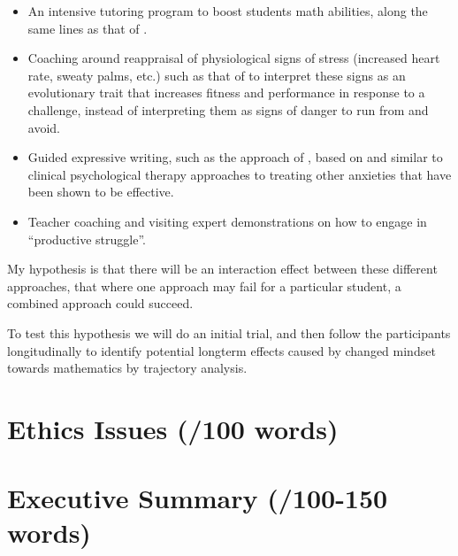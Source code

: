 \documentclass[14pt]{memoir}
\begin{document}
\begin{itemize}
	\item An intensive tutoring program to boost students math abilities, along the same lines as that of .
	\item Coaching around reappraisal of physiological signs of stress (increased heart rate, sweaty palms, etc.) such as that of  to interpret these signs as an evolutionary trait that increases fitness and performance in response to a challenge, instead of interpreting them as signs of danger to run from and avoid.
	\item Guided expressive writing, such as the approach of , based on and similar to clinical psychological therapy approaches to treating other anxieties that have been shown to be effective.
	\item Teacher coaching and visiting expert demonstrations on how to engage in ``productive struggle''.
\end{itemize}

My hypothesis is that there will be an interaction effect between these different approaches, that where one approach may fail for a particular student, a combined approach could succeed. 

To test this hypothesis we will do an initial trial, and then follow the participants longitudinally to identify potential longterm effects
caused by changed mindset towards mathematics by trajectory analysis. 






\section{Ethics Issues (/100 words)}

\section{Executive Summary (/100-150 words)}



\printglossaries

\glsresetall

 
\end{document}
